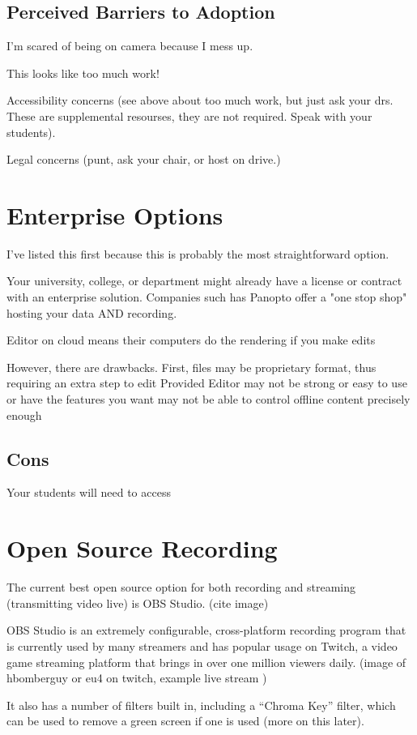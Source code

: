 \documentclass[sigconf]{acmart}
\begin{document}
\subsection{Perceived Barriers to Adoption}
I'm scared of being on camera because I mess up.

This looks like too much work!

Accessibility concerns (see above about too much work, but just ask your drs.  These are supplemental resourses, they are not required.  Speak with your students).

Legal concerns (punt, ask your chair, or host on drive.)

\section{Enterprise Options}
I've listed this first because this is probably the most straightforward option.

Your university, college, or department might already have a license or contract with an enterprise solution.
Companies such has Panopto  offer a "one stop shop" hosting your data AND recording.


Editor on cloud means their computers do the rendering if you make edits

However, there are drawbacks.
First, files may be proprietary format, thus requiring an extra step to edit
Provided Editor may not be strong or easy to use or have the features you want
may not be able to control offline content precisely enough

\subsection{Cons}
Your students will need to access

\section{Open Source Recording}
The current best open source option for both recording and streaming (transmitting video live) is OBS Studio. (cite image)

OBS Studio is an extremely configurable, cross-platform recording program that is currently used by many streamers and has popular usage on Twitch, a video game streaming platform that brings in over one million viewers daily.  (image of hbomberguy or eu4 on twitch, example live stream )

It also has a number of filters built in, including a  ``Chroma Key'' filter, which can be used to remove a green screen if one is used (more on this later).
\end{document}
